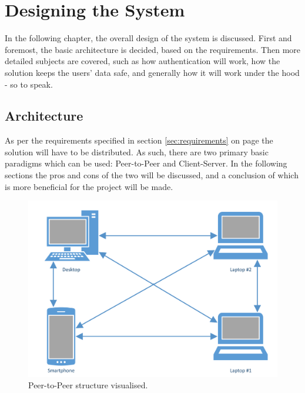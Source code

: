 \chapter{Designing the System}
	In the following chapter, the overall design of the system is discussed. First and foremost, the basic architecture is decided, based on the requirements. Then more detailed subjects are covered, such as how authentication will work, how the solution keeps the users' data safe, and generally how it will work under the hood - so to speak.

	\section{Architecture}
		\label{sec:arch}
		As per the requirements specified in section \ref{sec:requirements} on page \pageref{sec:requirements} the solution will have to be distributed. As such, there are two primary basic paradigms which can be used: Peer-to-Peer and Client-Server. In the following sections the pros and cons of the two will be discussed, and a conclusion of which is more beneficial for the project will be made.

		\begin{figure}
			\centering
			\includegraphics[width=\textwidth]{figures/design/PeerToPeer.pdf}
			\caption{Peer-to-Peer structure visualised.}
			\label{fig:peertopeer}
		\end{figure}

